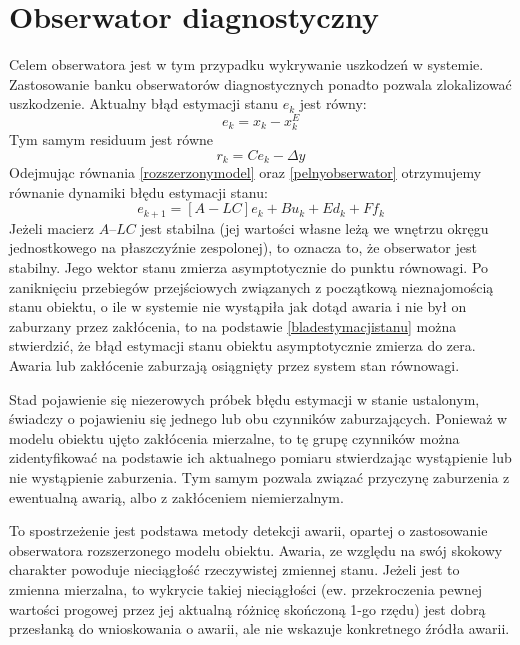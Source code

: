 \documentclass{article}
\begin{document}
	\section{Obserwator diagnostyczny}
		Celem obserwatora jest w tym przypadku wykrywanie uszkodzeń w systemie. Zastosowanie
		banku obserwatorów diagnostycznych ponadto pozwala zlokalizować uszkodzenie.
		Aktualny błąd estymacji stanu $e_k$ jest równy:
		\begin{equation}
			e_k = x_k - x^E_k
		\end{equation}
		Tym samym residuum jest równe 
		\begin{equation}
			r_k  = C e_k - \Delta y
		\end{equation}
		Odejmując równania \ref{rozszerzonymodel} oraz \ref{pelnyobserwator} otrzymujemy
		równanie dynamiki błędu estymacji stanu:
		\begin{equation}
			e_{k+1} = [ A - LC ] e_k + Bu_k + Ed_k + Ff_k
			\label{bladestymacjistanu}
		\end{equation}
		Jeżeli macierz $A – LC$ jest stabilna (jej wartości własne leżą we wnętrzu okręgu
		jednostkowego na płaszczyźnie zespolonej), to oznacza to, że obserwator jest stabilny.
		Jego wektor stanu zmierza asymptotycznie do punktu równowagi. Po zaniknięciu
		przebiegów przejściowych związanych z początkową nieznajomością stanu obiektu, o ile
		w systemie nie wystąpiła jak dotąd awaria i nie był on zaburzany przez zakłócenia, to na
		podstawie \eqref{bladestymacjistanu} można stwierdzić, że błąd estymacji stanu obiektu asymptotycznie
		zmierza do zera. Awaria lub zakłócenie zaburzają osiągnięty przez system stan
		równowagi.

		Stad pojawienie się niezerowych próbek błędu estymacji w stanie ustalonym, świadczy o
		pojawieniu się jednego lub obu czynników zaburzających. Ponieważ w modelu obiektu
		ujęto zakłócenia mierzalne, to tę grupę czynników można zidentyfikować na podstawie
		ich aktualnego pomiaru stwierdzając wystąpienie lub nie wystąpienie zaburzenia. Tym
		samym pozwala związać przyczynę zaburzenia z ewentualną awarią, albo z zakłóceniem
		niemierzalnym.

		To spostrzeżenie jest podstawa metody detekcji awarii, opartej o zastosowanie
		obserwatora rozszerzonego modelu obiektu. Awaria, ze względu na swój skokowy
		charakter powoduje nieciągłość rzeczywistej zmiennej stanu. Jeżeli jest to zmienna
		mierzalna, to wykrycie takiej nieciągłości (ew. przekroczenia pewnej wartości progowej
		przez jej aktualną różnicę skończoną 1-go rzędu) jest dobrą przesłanką do
		wnioskowania o awarii, ale nie wskazuje konkretnego źródła awarii.
\end{document}
